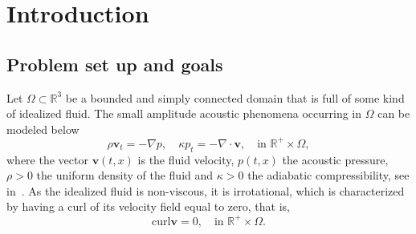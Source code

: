 \documentclass[10pt]{elsarticle}
\begin{document}

\section{Introduction}
\label{sec:intro}

\subsection{Problem set up and goals}
Let $\Omega\subset \mathbb{R}^3$ be a bounded and simply connected domain that is full of some kind of idealized fluid. The small amplitude acoustic phenomena occurring in $\Omega$ can be modeled below
\begin{equation}
	\rho\mathbf{v}_t = -\nabla p, \quad \kappa p_t = -\nabla\cdot\mathbf{v}, \quad \textrm{in $\mathbb{R}^{+} \times \Omega$}, \label{A1}
\end{equation}
where the vector $\mathbf{v}(t, x)$ is the fluid velocity, $p(t, x)$ the acoustic pressure, $\rho>0$ the uniform density of the fluid and $\kappa>0$ the adiabatic compressibility, see in~\cite{MI}. As the idealized fluid is non-viscous, it is irrotational, which is characterized by having a curl of its velocity field equal to zero, that is, 
\begin{equation} \label{A2}
	\mathrm{curl} \mathbf{v} = 0,  \quad \textrm{in $\mathbb{R}^{+} \times \Omega$}.
\end{equation}
\end{document}
